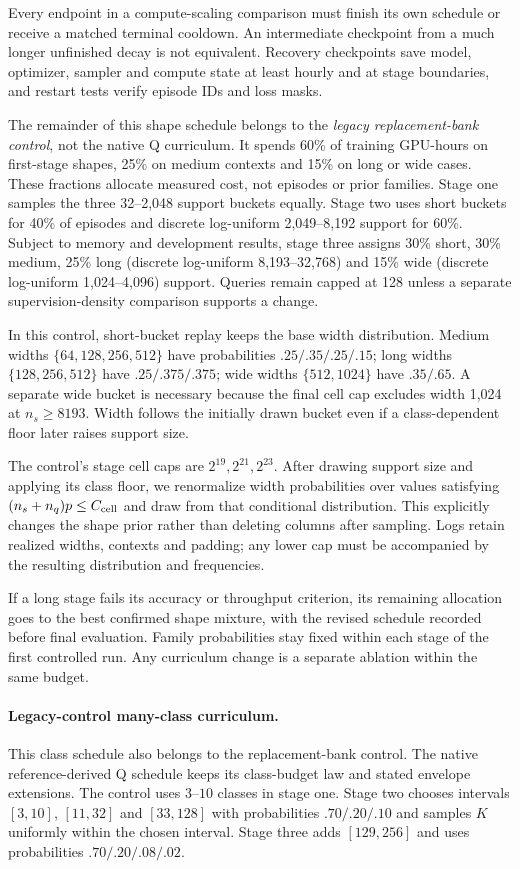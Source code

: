 \documentclass[11pt]{article}
\begin{document}
Every endpoint in a compute-scaling comparison must finish its own schedule or receive a matched terminal cooldown. An intermediate checkpoint from a much longer unfinished decay is not equivalent. Recovery checkpoints save model, optimizer, sampler and compute state at least hourly and at stage boundaries, and restart tests verify episode IDs and loss masks.

The remainder of this shape schedule belongs to the \emph{legacy replacement-bank control}, not the native Q curriculum. It spends 60\% of training GPU-hours on first-stage shapes, 25\% on medium contexts and 15\% on long or wide cases. These fractions allocate measured cost, not episodes or prior families. Stage one samples the three 32--2,048 support buckets equally. Stage two uses short buckets for 40\% of episodes and discrete log-uniform 2,049--8,192 support for 60\%. Subject to memory and development results, stage three assigns 30\% short, 30\% medium, 25\% long (discrete log-uniform 8,193--32,768) and 15\% wide (discrete log-uniform 1,024--4,096) support. Queries remain capped at 128 unless a separate supervision-density comparison supports a change.

In this control, short-bucket replay keeps the base width distribution. Medium widths $\{64,128,256,512\}$ have probabilities $.25/.35/.25/.15$; long widths $\{128,256,512\}$ have $.25/.375/.375$; wide widths $\{512,1024\}$ have $.35/.65$. A separate wide bucket is necessary because the final cell cap excludes width 1,024 at $n_s\geq8193$. Width follows the initially drawn bucket even if a class-dependent floor later raises support size.

The control's stage cell caps are $2^{19},2^{21},2^{23}$. After drawing support size and applying its class floor, we renormalize width probabilities over values satisfying $(n_s+n_q)p\leq C_{\rm cell}$ and draw from that conditional distribution. This explicitly changes the shape prior rather than deleting columns after sampling. Logs retain realized widths, contexts and padding; any lower cap must be accompanied by the resulting distribution and frequencies.

If a long stage fails its accuracy or throughput criterion, its remaining allocation goes to the best confirmed shape mixture, with the revised schedule recorded before final evaluation. Family probabilities stay fixed within each stage of the first controlled run. Any curriculum change is a separate ablation within the same budget.


\paragraph{Legacy-control many-class curriculum.} This class schedule also belongs to the replacement-bank control. The native reference-derived Q schedule keeps its class-budget law and stated envelope extensions. The control uses $3$--$10$ classes in stage one. Stage two chooses intervals $[3,10]$, $[11,32]$ and $[33,128]$ with probabilities $.70/.20/.10$ and samples $K$ uniformly within the chosen interval. Stage three adds $[129,256]$ and uses probabilities $.70/.20/.08/.02$.
\end{document}
